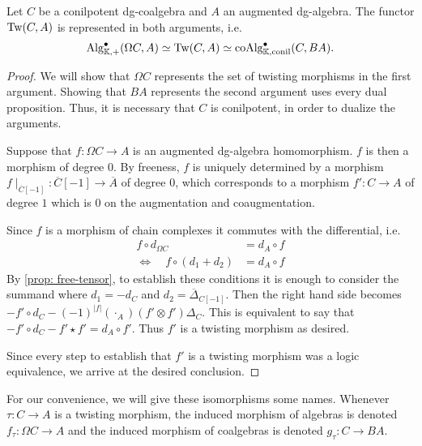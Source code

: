 \documentclass[../thesis.tex]{subfiles}
\begin{document}
            \begin{thm}\label{thm: cobar-bar-adj}
                Let $C$ be a conilpotent dg-coalgebra and $A$ an augmented dg-algebra. The functor $\tt{Tw}(C,A)$ is represented in both arguments, i.e.
                \begin{align*}
                    \tt{Alg}_{\mathbb{K},+}^\bullet(\Omega C, A)\simeq \tt{Tw}(C, A) \simeq \tt{coAlg}_{\mathbb{K},\tt{conil}}^\bullet(C, BA)\text{.}
                \end{align*}
            \end{thm}

            \begin{proof}
                We will show that $\Omega C$ represents the set of twisting morphisms in the first argument. Showing that $BA$ represents the second argument uses every dual proposition. Thus, it is necessary that $C$ is conilpotent, in order to dualize the arguments.

                Suppose that $f:\Omega C \rightarrow A$ is an augmented dg-algebra homomorphism. $f$ is then a morphism of degree $0$. By freeness, $f$ is uniquely determined by a morphism $f\mid_{\overline{C}[-1]}:\overline{C}[-1]\rightarrow \overline{A}$ of degree $0$, which corresponds to a morphism $f':C\rightarrow A$ of degree $1$ which is $0$ on the augmentation and coaugmentation. 

                Since $f$ is a morphism of chain complexes it commutes with the differential, i.e. 
                \begin{align*}
                    f\circ d_{\Omega C} & = d_A\circ f \\
                    \Leftrightarrow\quad f\circ (d_1 + d_2) & = d_A\circ f 
                \end{align*}
                By \ref{prop: free-tensor}, to establish these conditions it is enough to consider the summand where $d_1 = -d_C$ and $d_2 = \overline{\Delta}_{C[-1]}$. Then the right hand side becomes $-f' \circ d_C - (-1)^{|f|}(\cdot_A)(f' \otimes f')\Delta_C$. This is equivalent to say that $-f'\circ d_C - f'\star f' = d_A\circ f'$. Thus $f'$ is a twisting morphism as desired.

                Since every step to establish that $f'$ is a twisting morphism was a logic equivalence, we arrive at the desired conclusion.
            \end{proof}

            For our convenience, we will give these isomorphisms some names. Whenever $\tau : C \rightarrow A$ is a twisting morphism, the induced morphism of algebras is denoted $f_\tau : \Omega C \rightarrow A$ and the induced morphism of coalgebras is denoted $g_\tau : C \rightarrow BA$.
\end{document}
